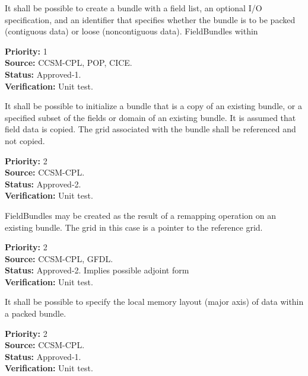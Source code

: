 

\label{req:bundlecreatewalloc}
It shall be possible to create a bundle with a field list, an 
optional I/O specification, and an identifier that specifies whether 
the bundle is to be packed (contiguous data) or loose (noncontiguous data).
FieldBundles within 
\begin{reqlist}
{\bf Priority:} 1\\
{\bf Source:} CCSM-CPL, POP, CICE. \\
{\bf Status:} Approved-1. \\
{\bf Verification:} Unit test. 
\end{reqlist}

It shall be possible to initialize a bundle that is a copy of an
existing bundle, or a specified subset of the fields or domain of an 
existing bundle. It is assumed that field data is copied.  The grid associated with the 
bundle shall be referenced and not copied.  
\begin{reqlist}
{\bf Priority:} 2 \\
{\bf Source:} CCSM-CPL. \\
{\bf Status:} Approved-2. \\
{\bf Verification:} Unit test. 
\end{reqlist}

FieldBundles may be created as the result of a remapping operation on an 
existing bundle.  The grid in this case is a pointer to the reference 
grid.
\begin{reqlist}
{\bf Priority:} 2 \\
{\bf Source:} CCSM-CPL, GFDL. \\
{\bf Status:} Approved-2. Implies possible adjoint form\\
{\bf Verification:} Unit test. 
\end{reqlist}



It shall be possible to specify the local memory layout (major axis) 
of data within a packed bundle.  
\begin{reqlist}
{\bf Priority:} 2 \\
{\bf Source:} CCSM-CPL. \\
{\bf Status:} Approved-1. \\
{\bf Verification:} Unit test. 
\end{reqlist}

